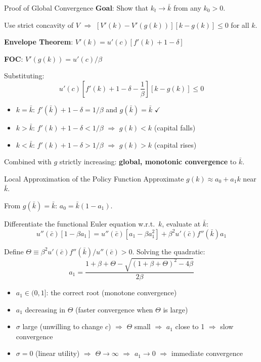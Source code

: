 \documentclass[blue]{beamer}
\begin{document}
\begin{frame}{Proof of Global Convergence}
	\textbf{Goal}: Show that $k_t \to \bar{k}$ from any $k_0 > 0$.
	
	Use strict concavity of $V$ $\Rightarrow$ $[V'(k) - V'(g(k))][k - g(k)] \leq 0$ for all $k$.
	
	\textbf{Envelope Theorem}: $V'(k) = u'(c)[f'(k) + 1 - \delta]$
	
	\textbf{FOC}: $V'(g(k)) = u'(c)/\beta$
	
	Substituting:
	\[
	u'(c)\left[f'(k) + 1 - \delta - \frac{1}{\beta}\right][k - g(k)] \leq 0
	\]
	\vspace{-17pt}
	\begin{itemize}
		\item $k = \bar{k}$: $f'(\bar{k}) + 1 - \delta = 1/\beta$ and $g(\bar{k}) = \bar{k}$ $\checkmark$
		\item $k > \bar{k}$: $f'(k) + 1 - \delta < 1/\beta$ $\Rightarrow$ $g(k) < k$ (capital falls)
		\item $k < \bar{k}$: $f'(k) + 1 - \delta > 1/\beta$ $\Rightarrow$ $g(k) > k$ (capital rises)
	\end{itemize}
	
	Combined with $g$ strictly increasing: \textbf{global, monotonic convergence} to $\bar{k}$.
\end{frame}
\begin{frame}{Local Approximation of the Policy Function}
	Approximate $g(k) \approx a_0 + a_1 k$ near $\bar{k}$.
	

	From $g(\bar{k}) = \bar{k}$: $a_0 = \bar{k}(1 - a_1)$.
	

	Differentiate the functional Euler equation w.r.t.\ $k$, evaluate at $\bar{k}$:
	\[
	u''(\bar{c})[1 - \beta a_1] = u''(\bar{c})[a_1 - \beta a_1^2] + \beta^2 u'(\bar{c})f''(\bar{k})a_1
	\]
	
	Define $\Theta \equiv \beta^2 u'(\bar{c}) f''(\bar{k})/u''(\bar{c}) > 0$. Solving the quadratic:
	\[
	a_1 = \frac{1 + \beta + \Theta - \sqrt{(1+\beta+\Theta)^2 - 4\beta}}{2\beta}
	\]
	\vspace{-20pt}
	\begin{itemize}
		\item $a_1 \in (0, 1]$: the correct root (monotone convergence)
		\item $a_1$ decreasing in $\Theta$ (faster convergence when $\Theta$ is large)
		\item $\sigma$ large (unwilling to change $c$) $\Rightarrow$ $\Theta$ small $\Rightarrow$ $a_1$ close to 1 $\Rightarrow$ slow convergence
		\item $\sigma = 0$ (linear utility) $\Rightarrow$ $\Theta \to \infty$ $\Rightarrow$ $a_1 \to 0$ $\Rightarrow$ immediate convergence
	\end{itemize}
\end{frame}
\end{document}
